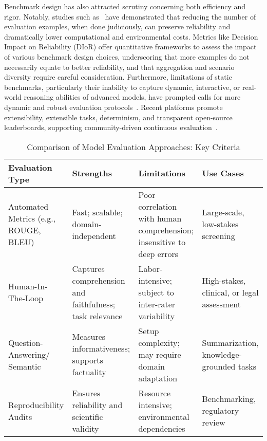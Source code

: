 \documentclass[sigconf]{acmart}
\begin{document}
Benchmark design has also attracted scrutiny concerning both efficiency and rigor. Notably, studies such as~\cite{ref104} have demonstrated that reducing the number of evaluation examples, when done judiciously, can preserve reliability and dramatically lower computational and environmental costs. Metrics like Decision Impact on Reliability (DIoR) offer quantitative frameworks to assess the impact of various benchmark design choices, underscoring that more examples do not necessarily equate to better reliability, and that aggregation and scenario diversity require careful consideration. Furthermore, limitations of static benchmarks, particularly their inability to capture dynamic, interactive, or real-world reasoning abilities of advanced models, have prompted calls for more dynamic and robust evaluation protocols~\cite{ref76, ref91, ref94, ref101, ref104}. Recent platforms promote extensibility, extensible tasks, determinism, and transparent open-source leaderboards, supporting community-driven continuous evaluation~\cite{ref101}.

\begin{table*}[htbp]
\centering
\caption{Comparison of Model Evaluation Approaches: Key Criteria}
\label{tab:evaluation_criteria}
\begin{adjustbox}{max width=\textwidth}
\begin{tabular}{@{}llll@{}}
\toprule
\textbf{Evaluation Type} & \textbf{Strengths} & \textbf{Limitations} & \textbf{Use Cases} \\
\midrule
Automated Metrics (e.g., ROUGE, BLEU) & Fast; scalable; domain-independent & Poor correlation with human comprehension; insensitive to deep errors & Large-scale, low-stakes screening \\
Human-In-The-Loop & Captures comprehension and faithfulness; task relevance & Labor-intensive; subject to inter-rater variability & High-stakes, clinical, or legal assessment \\
Question-Answering/ Semantic & Measures informativeness; supports factuality & Setup complexity; may require domain adaptation & Summarization, knowledge-grounded tasks \\
Reproducibility Audits & Ensures reliability and scientific validity & Resource intensive; environmental dependencies & Benchmarking, regulatory review \\
\bottomrule
\end{tabular}
\end{adjustbox}
\end{table*}
\end{document}

